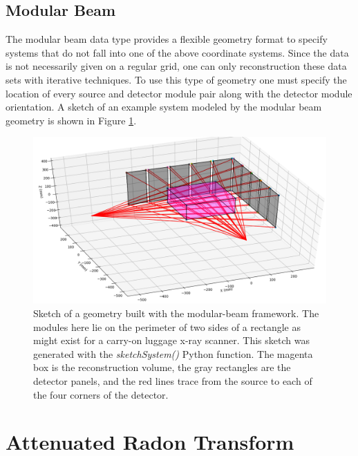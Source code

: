 \documentclass[11pt]{article}
\begin{document}
\subsection{Modular Beam}

The modular beam data type provides a flexible geometry format to specify systems that do not fall into one of the above coordinate systems.  Since the data is not necessarily given on a regular grid, one can only reconstruction these data sets with iterative techniques.  To use this type of geometry one must specify the location of every source and detector module pair along with the detector module orientation.  A sketch of an example system modeled by the modular beam geometry is shown in Figure \ref{fig:modularBeamSketch}.

\begin{figure}[h]
\begin{center}
\includegraphics[scale=0.5]{modularBeam}
\end{center}
\caption{Sketch of a geometry built with the modular-beam framework.  The modules here lie on the perimeter of two sides of a rectangle as might exist for a carry-on luggage x-ray scanner.  This sketch was generated with the \textit{sketchSystem()} Python function.  The  magenta box is the reconstruction volume, the gray rectangles are the detector panels, and the red lines trace from the source to each of the four corners of the detector.} \label{fig:modularBeamSketch}
\end{figure}

\section{Attenuated Radon Transform}
\end{document}
